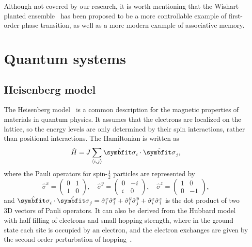 Although not covered by our research, it is worth mentioning that the Wishart planted ensemble~\cite{hamze2020wishart, hibat2021variational} has been proposed to be a more controllable example of first-order phase transition, as well as a more modern example of associative memory.

\section{Quantum systems}
\label{sec:qu-sys}

\subsection{Heisenberg model}

The Heisenberg model~\cite{heisenberg1928theorie} is a common description for the magnetic properties of materials in quantum physics. It assumes that the electrons are localized on the lattice, so the energy levels are only determined by their spin interactions, rather than positional interactions. The Hamiltonian is written as
\begin{equation}
\hat{H} = J \sum_{\langle i, j \rangle} \hat{\vsi}_i \cdot \hat{\vsi}_j,
\label{eq:heis}
\end{equation}
where the Pauli operators for spin-$\frac{1}{2}$ particles are represented by
\begin{equation}
\hat{\sigma}^x = \begin{pmatrix} 0 & 1 \\ 1 & 0 \end{pmatrix}, \quad
\hat{\sigma}^y = \begin{pmatrix} 0 & -i \\ i & 0 \end{pmatrix}, \quad
\hat{\sigma}^z = \begin{pmatrix} 1 & 0 \\ 0 & -1 \end{pmatrix},
\end{equation}
and $\hat{\vsi}_i \cdot \hat{\vsi}_j = \hat{\sigma}^x_i \hat{\sigma}^x_j + \hat{\sigma}^y_i \hat{\sigma}^y_j + \hat{\sigma}^z_i \hat{\sigma}^z_j$ is the dot product of two 3D vectors of Pauli operators. It can also be derived from the Hubbard model with half filling of electrons and small hopping strength, where in the ground state each site is occupied by an electron, and the electron exchanges are given by the second order perturbation of hopping~\cite{cleveland1976obtaining}.

